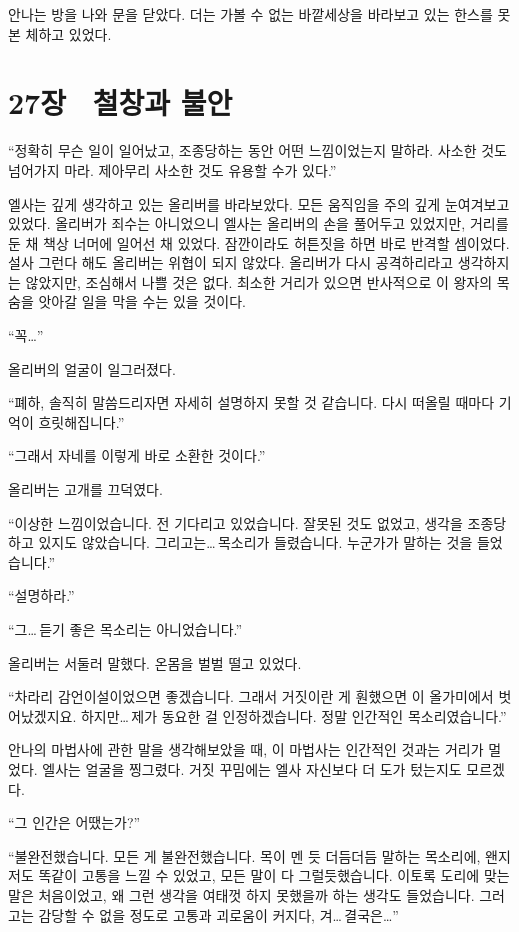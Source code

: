 안나는 방을 나와 문을 닫았다. 더는 가볼 수 없는 바깥세상을 바라보고 있는 한스를 못 본 체하고 있었다.



\chapter[27장  철창과 불안][27장\hspace*{.5em}철창과 불안]{27장 \ 철창과 불안}



\forceindent``정확히 무슨 일이 일어났고, 조종당하는 동안 어떤 느낌이었는지 말하라. 사소한 것도 넘어가지 마라. 제아무리 사소한 것도 유용할 수가 있다.''

엘사는 깊게 생각하고 있는 올리버를 바라보았다. 모든 움직임을 주의 깊게 눈여겨보고 있었다. 올리버가 죄수는 아니었으니 엘사는 올리버의 손을 풀어두고 있었지만, 거리를 둔 채 책상 너머에 일어선 채 있었다. 잠깐이라도 허튼짓을 하면 바로 반격할 셈이었다. 설사 그런다 해도 올리버는 위협이 되지 않았다. 올리버가 다시 공격하리라고 생각하지는 않았지만, 조심해서 나쁠 것은 없다. 최소한 거리가 있으면 반사적으로 이 왕자의 목숨을 앗아갈 일을 막을 수는 있을 것이다.

``꼭\ldots''

올리버의 얼굴이 일그러졌다.

``폐하, 솔직히 말씀드리자면 자세히 설명하지 못할 것 같습니다. 다시 떠올릴 때마다 기억이 흐릿해집니다.''

``그래서 자네를 이렇게 바로 소환한 것이다.''

올리버는 고개를 끄덕였다.

``이상한 느낌이었습니다. 전 기다리고 있었습니다. 잘못된 것도 없었고, 생각을 조종당하고 있지도 않았습니다. 그리고는\ldots\,목소리가 들렸습니다. 누군가가 말하는 것을 들었습니다.''

``설명하라.''

``그\ldots\,듣기 좋은 목소리는 아니었습니다.''

올리버는 서둘러 말했다. 온몸을 벌벌 떨고 있었다.

``차라리 감언이설이었으면 좋겠습니다. 그래서 거짓이란 게 훤했으면 이 올가미에서 벗어났겠지요. 하지만\ldots\,제가 동요한 걸 인정하겠습니다. 정말 인간적인 목소리였습니다.''

안나의 마법사에 관한 말을 생각해보았을 때, 이 마법사는 인간적인 것과는 거리가 멀었다. 엘사는 얼굴을 찡그렸다. 거짓 꾸밈에는 엘사 자신보다 더 도가 텄는지도 모르겠다.

``그 인간은 어땠는가?''

``불완전했습니다. 모든 게 불완전했습니다. 목이 멘 듯 더듬더듬 말하는 목소리에, 왠지 저도 똑같이 고통을 느낄 수 있었고, 모든 말이 다 그럴듯했습니다. 이토록 도리에 맞는 말은 처음이었고, 왜 그런 생각을 여태껏 하지 못했을까 하는 생각도 들었습니다. 그러고는 감당할 수 없을 정도로 고통과 괴로움이 커지다, 겨\ldots\,결국은\ldots''

